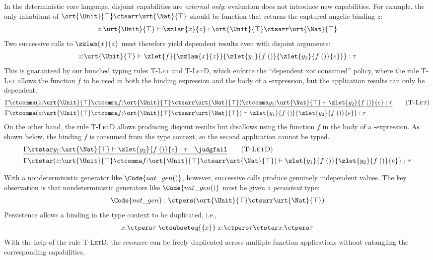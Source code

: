 In the deterministic core language, disjoint capabilities are \emph{external only}:
evaluation does not introduce new capabilities.
For example, the only inhabitant of $\ort{\Unit}{\top} \ctsarr \urt{\Nat}{\top}$ should be function that returns the captured angelic binding $z$:
\begin{align*}
  z{:}\urt{\Unit}{\top} \vdash \zzlam{x}{z} : \ort{\Unit}{\top} \ctsarr \urt{\Nat}{\top}
\end{align*}\noindent
Two successive calls to $\zzlam{x}{z}$ must therefore yield dependent results even with disjoint arguments:
\begin{align*}
  z{:}\urt{\Unit}{\top} \vdash \zlet{f}{\zzlam{x}{z}}{\zlet{y_1}{f\;()}{\zlet{y_2}{f\;()}{e}}} : \tau
\end{align*}\noindent
This is guaranteed by our bunched typing rules \textsc{T-Let} and \textsc{T-LetD}, which enforce the ``dependent xor consumed'' policy, where the rule \textsc{T-Let} allows the function $f$ to be used in both the binding expression and the body of a -expression, but the application results can only be dependent.
\begin{align*}
  &\underline{\Gamma \ctcomma (z{:}\urt{\Unit}{\top} \ctcomma f{:}\ort{\Unit}{\top} \ctsarr \urt{\Nat}{\top}) \ctcomma y_1{:}\urt{\Nat}{\top} \vdash \zlet{y_2}{f\;()}{e} : \tau} \tag{\textsc{T-Let}}
  \\&\Gamma \ctcomma (z{:}\urt{\Unit}{\top} \ctcomma f{:}\ort{\Unit}{\top} \ctsarr \urt{\Nat}{\top}) \vdash \zlet{y_1}{f\;()}{\zlet{y_2}{f\;()}{e}} : \tau
\end{align*}\noindent
On the other hand, the rule \textsc{T-LetD} allows producing disjoint results but disallows using the function $f$ in the body of a -expression. As shown below, the binding $f$ is consumed from the type context, so the second application cannot be typed.
\begin{align*}
  &\underline{\Gamma \ctstar y_1{:}\urt{\Nat}{\top} \vdash \zlet{y_2}{f\;()}{e} : \tau \quad \judgfail}  \tag{\textsc{T-LetD}}
  \\&\Gamma \ctstar (z{:}\urt{\Unit}{\top} \ctcomma f{:}\ort{\Unit}{\top} \ctsarr \urt{\Nat}{\top}) \vdash \zlet{y_1}{f\;()}{\zlet{y_2}{f\;()}{e}} : \tau
\end{align*}\noindent

With a nondeterministic generator like $\Code{nat\_gen()}$, however,
successive calls produce genuinely independent values. 
The key
observation is that nondeterministic generators like
$\Code{nat\_gen()}$ must be given a \emph{persistent} type:
\begin{align*}
  \Code{nat\_gen} : \ctpers (\ort{\Unit}{\top} \ctsarr \urt{\Nat}{\top})
\end{align*}
Persistence allows a binding in the type context to be duplicated, i.e.,
\begin{align*}
  x{:}\ctpers \tau \; \ctsubseteq{\{x\}} \; x{:}\ctpers \tau \ctstar x{:}\ctpers \tau 
\end{align*}\noindent
With the help of the rule \textsc{T-LetD}, the resource can be freely duplicated across multiple function applications without entangling the corresponding
capabilities.

